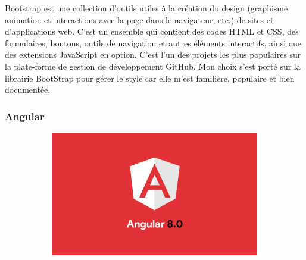 \documentclass{article}
\begin{document}
Bootstrap est une collection d'outils utiles à la création du design (graphisme, animation et interactions avec la page dans le navigateur, etc.) de sites et d'applications web. C'est un ensemble qui contient des codes HTML et CSS, des formulaires, boutons, outils de navigation et autres éléments interactifs, ainsi que des extensions JavaScript en option. C'est l'un des projets les plus populaires sur la plate-forme de gestion de développement GitHub.
Mon choix s'est porté sur la librairie BootStrap pour gérer le style car elle m'est familière, populaire et bien documentée.
\subsubsection{Angular}

\begin{figure}[h!]
	\centering
  	\begin{subfigure}[b]{0.4\linewidth}
    \includegraphics[width=\linewidth]{Angular.jpeg}
  	\end{subfigure}
\end{figure}
\end{document}
